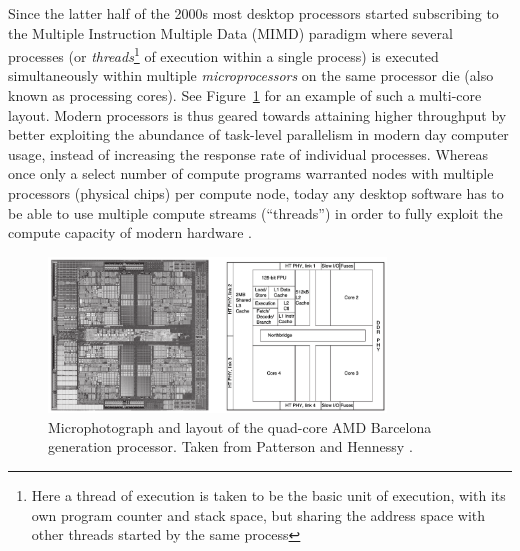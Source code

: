 Since the latter half of the 2000s most desktop processors started subscribing to the Multiple Instruction Multiple Data (MIMD) paradigm where several processes 
(or \textit{threads}\footnote{Here a thread of execution is taken to be the basic unit of execution, with its own program counter and stack space, but sharing the address space with other threads started by the same process} of execution 
within a single process) is executed simultaneously within multiple \textit{microprocessors} on the same processor die (also known as processing cores). 
See Figure~\ref{fig_amd_barcelona_arch} for an example of such a multi-core layout. Modern processors is thus geared towards attaining higher throughput by better exploiting the 
abundance of task-level parallelism in modern day computer usage, instead of increasing the response rate of individual processes. Whereas once only a select number of compute 
programs warranted nodes with multiple processors (physical chips) per compute node, today any desktop software has to be able to use multiple compute streams (``threads'') 
in order to fully exploit the compute capacity of modern hardware \cite{patterson2009computer} \cite{akhter2006multi}. 
\begin{figure}[ht!]
 \begin{mdframed}
  \centering
  \includegraphics[width=0.8\textwidth]{images/amd_barcelona.png}
  \caption[AMD Barcelona]{Microphotograph and layout of the quad-core AMD Barcelona generation processor. Taken from Patterson and Hennessy \cite[ch. 1]{patterson2009computer}.}
  \label{fig_amd_barcelona_arch}
 \end{mdframed}
\end{figure}

